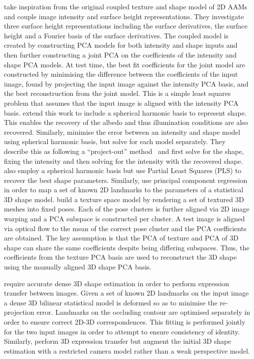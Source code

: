 \citet{castelan2007coupled} take inspiration from the original coupled 
texture and shape model of 2D AAMs~\cite{cootes2001active} and couple image
intensity and surface height representations. They investigate three surface
height representations including the surface derivatives, the surface height
and a Fourier basis of the surface derivatives. The coupled model is created
by constructing PCA models for both intensity and shape inputs and then
further constructing a joint PCA on the coefficients of the intensity and shape
PCA models. At test time, the best fit coefficients for the joint model are
constructed by minimising the difference between the coefficients of
the input image, found by projecting the input image against the intensity PCA
basis, and the best reconstruction from the joint model. This is a simple
least squares problem that assumes that the input image is aligned
with the intensity PCA basis. \citet{ahmed2007new} extend this work to
include a spherical harmonic basis to represent shape. This enables
the recovery of the albedo and thus illumination conditions are also
recovered. Similarly, \citet{rara2009model} minimise the error between
an intensity and shape model using spherical harmonic basis, but solve for 
each model separately. They describe this as following a ``project-out'' 
method~\cite{matthews2004active} and first solve for the shape, fixing the 
intensity and then solving for the intensity with the recovered shape. 
\citet{rara2010face} also employ a spherical harmonic basis but use
Partial Least Squares (PLS) to recover the best shape parameters. Similarly,
\citet{rara2011model} use principal component regression in order to map
a set of known 2D landmarks to the parameters of a statistical 3D shape model.
\citet{kouzani1998example} build a texture space model by rendering a set of
textured 3D meshes into fixed poses. Each of the pose clusters is further aligned
via 2D image warping and a PCA subspace is constructed per cluster. A test image
is aligned via optical flow to the mean of the correct pose cluster and the PCA
coefficients are obtained. The key assumption is that the PCA of texture and PCA
of 3D shape can share the same coefficients despite being differing subspaces.
Thus, the coefficients from the texture PCA basis are used to reconstruct the 3D
shape using the manually aligned 3D shape PCA basis.

\citet{Yang:2011gj} require accurate dense 3D shape estimation in order to
perform expression transfer between images. Given a set of known 2D landmarks on
the input image a dense 3D bilinear statistical model is deformed so as to
minimise the re-projection error. Landmarks on the occluding contour are
optimised separately in order to ensure correct 2D-3D correspondences. This
fitting is performed jointly for the two input images in order to attempt to
ensure consistency of identity.
Similarly, \citet{yang2012face} perform 3D expression transfer
but augment the initial 3D shape estimation with a restricted camera model
rather than a weak perspective model.

